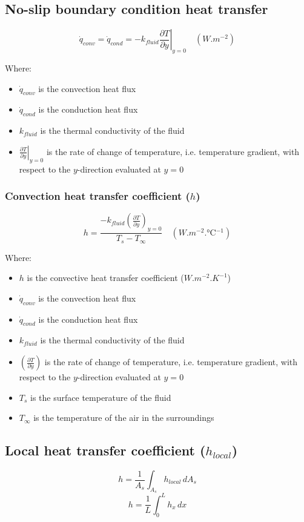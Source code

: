 \documentclass[11pt]{article}
\begin{document}
\subsection{No-slip boundary condition heat transfer}
\label{sec:org77da2a0}
\[\dot{q}_{conv} = \dot{q}_{cond} = - k_{fluid} \left. \frac{\partial T}{\partial y} \right|_{y = 0} \quad (\unit{W.m^{-2}})\]

Where:
\begin{itemize}
\item \(\dot{q}_{conv}\) is the convection heat flux
\item \(\dot{q}_{cond}\) is the conduction heat flux
\item \(k_{fluid}\) is the thermal conductivity of the fluid
\item \(\left. \frac{\partial T}{\partial y} \right|_{y = 0}\) is the rate of change of temperature, i.e. temperature gradient, with respect to the \(y\)-direction evaluated at \(y = 0\)
\end{itemize}

\subsubsection{Convection heat transfer coefficient (\(h\))}
\label{sec:org442a778}
\[h = \frac{-k_{fluid} \left(\frac{\partial T}{\partial y} \right)_{y=0}}{T_s - T_{\infty}} \quad (\unit{W.m^{-2}.\degreeCelsius^{-1}})\]

Where:
\begin{itemize}
\item \(h\) is the convective heat transfer coefficient (\(\unit{W.m^{-2}.K^{-1}}\))
\item \(\dot{q}_{conv}\) is the convection heat flux
\item \(\dot{q}_{cond}\) is the conduction heat flux
\item \(k_{fluid}\) is the thermal conductivity of the fluid
\item \(\left(\frac{\partial T}{\partial y} \right)\) is the rate of change of temperature, i.e. temperature gradient, with respect to the \(y\)-direction evaluated at \(y = 0\)
\item \(T_s\) is the surface temperature of the fluid
\item \(T_{\infty}\) is the temperature of the air in the surroundings
\end{itemize}

 \newpage

\subsection{Local heat transfer coefficient (\(h_{local}\))}
\label{sec:org0bb5fd1}
\[h = \frac{1}{A_s} \int_{A_s} h_{local} \, dA_s\]
\[h = \frac{1}{L} \int_0^L h_x \, dx\]
\end{document}

